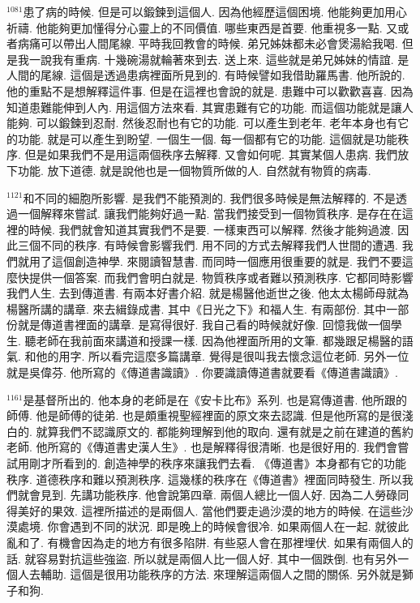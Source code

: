 \documentclass{book}
\begin{document}
$^{1081}$患了病的時候.
但是可以鍛鍊到這個人.
因為他經歷這個困境.
他能夠更加用心祈禱.
他能夠更加懂得分心靈上的不同價值.
哪些東西是首要.
他重視多一點.
又或者病痛可以帶出人間尾線.
平時我回教會的時候.
弟兄姊妹都未必會煲湯給我喝.
但是我一說我有重病.
十幾碗湯就輪著來到去.
送上來.
這些就是弟兄姊妹的情誼.
是人間的尾線.
這個是透過患病裡面所見到的.
有時候譬如我借助羅馬書.
他所說的.
他的重點不是想解釋這件事.
但是在這裡也會說的就是.
患難中可以歡歡喜喜.
因為知道患難能伸到人內.
用這個方法來看.
其實患難有它的功能.
而這個功能就是讓人能夠.
可以鍛鍊到忍耐.
然後忍耐也有它的功能.
可以產生到老年.
老年本身也有它的功能.
就是可以產生到盼望.
一個生一個.
每一個都有它的功能.
這個就是功能秩序.
但是如果我們不是用這兩個秩序去解釋.
又會如何呢.
其實某個人患病.
我們放下功能.
放下道德.
就是說他也是一個物質所做的人.
自然就有物質的病毒.

$^{1121}$和不同的細胞所影響.
是我們不能預測的.
我們很多時候是無法解釋的.
不是透過一個解釋來嘗試.
讓我們能夠好過一點.
當我們接受到一個物質秩序.
是存在在這裡的時候.
我們就會知道其實我們不是要.
一樣東西可以解釋.
然後才能夠過渡.
因此三個不同的秩序.
有時候會影響我們.
用不同的方式去解釋我們人世間的遭遇.
我們就用了這個創造神學.
來閱讀智慧書.
而同時一個應用很重要的就是.
我們不要這麼快提供一個答案.
而我們會明白就是.
物質秩序或者難以預測秩序.
它都同時影響我們人生.
去到傳道書.
有兩本好書介紹.
就是楊醫他逝世之後.
他太太楊師母就為楊醫所講的講章.
來去緝錄成書.
其中《日光之下》和福人生.
有兩部份.
其中一部份就是傳道書裡面的講章.
是寫得很好.
我自己看的時候就好像.
回憶我做一個學生.
聽老師在我前面來講道和授課一樣.
因為他裡面所用的文筆.
都幾跟足楊醫的語氣.
和他的用字.
所以看完這麼多篇講章.
覺得是很叫我去懷念這位老師.
另外一位就是吳偉芬.
他所寫的《傳道書識讀》.
你要識讀傳道書就要看《傳道書識讀》.

$^{1161}$是基督所出的.
他本身的老師是在《安卡比布》系列.
也是寫傳道書.
他所跟的師傅.
他是師傅的徒弟.
也是頗重視聖經裡面的原文來去認識.
但是他所寫的是很淺白的.
就算我們不認識原文的.
都能夠理解到他的取向.
還有就是之前在建道的舊約老師.
他所寫的《傳道書史漢人生》.
也是解釋得很清晰.
也是很好用的.
我們會嘗試用剛才所看到的.
創造神學的秩序來讓我們去看.
《傳道書》本身都有它的功能秩序.
道德秩序和難以預測秩序.
這幾樣的秩序在《傳道書》裡面同時發生.
所以我們就會見到.
先講功能秩序.
他會說第四章.
兩個人總比一個人好.
因為二人勞碌同得美好的果效.
這裡所描述的是兩個人.
當他們要走過沙漠的地方的時候.
在這些沙漠處境.
你會遇到不同的狀況.
即是晚上的時候會很冷.
如果兩個人在一起.
就彼此亂和了.
有機會因為走的地方有很多陷阱.
有些惡人會在那裡埋伏.
如果有兩個人的話.
就容易對抗這些強盜.
所以就是兩個人比一個人好.
其中一個跌倒.
也有另外一個人去輔助.
這個是很用功能秩序的方法.
來理解這兩個人之間的關係.
另外就是獅子和狗.
\end{document}

